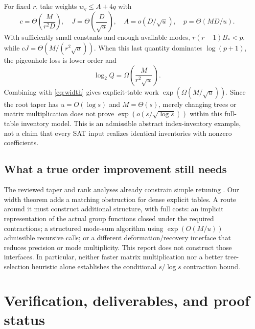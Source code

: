 \documentclass[11pt]{article}
\theoremstyle{remark}\newtheorem{remark}[theorem]{Remark}
\begin{document}
For fixed $r$, take weights $w_q\le A+4q$ with
\[
 c=\Theta\left(\frac{M}{r^2D}\right),\quad
 J=\Theta\left(\frac D{\sqrt u}\right),\quad
 A=o(D/\sqrt u),\quad p=\Theta(MD/u).
\]
With sufficiently small constants and enough available modes,
$r(r-1)B_*<p$, while
$cJ=\Theta(M/(r^2\sqrt u))$. When this last quantity dominates
$\log(p+1)$, the pigeonhole loss is lower order and
\[
 \log_2 Q=\Omega\left(\frac{M}{r^2\sqrt u}\right).
\]
Combining with \eqref{eq:width} gives explicit-table work
$\exp(\Omega(M/\sqrt u))$. Since the root taper has $u=O(\log s)$ and
$M=\Theta(s)$, merely changing trees or matrix multiplication does not
prove $\exp(o(s/\sqrt{\log s}))$ within this full-table inventory model.
This is an admissible abstract index-inventory example, not a claim that
every SAT input realizes identical inventories with nonzero coefficients.

\subsection{What a true order improvement still needs}
The reviewed taper and rank analyses already constrain simple retuning
\cite{precision,rank}. Our width theorem adds a matching obstruction for
dense explicit tables. A route around it must construct additional
structure, with full costs: an implicit representation of the actual group
functions closed under the required contractions; a structured mode-sum
algorithm using $\exp(O(M/u))$ admissible recursive calls; or a different
deformation/recovery interface that reduces precision or mode multiplicity.
This report does not construct those interfaces. In particular, neither
faster matrix multiplication nor a better tree-selection heuristic alone
establishes the conditional $s/\log s$ contraction bound.

\section{Verification, deliverables, and proof status}
\label{sec:validation}
\end{document}
